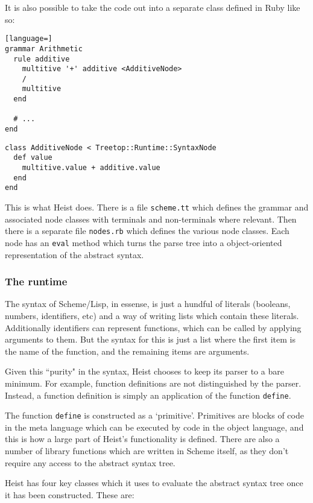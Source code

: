 It is also possible to take the code out into a separate class defined in Ruby like so:

\begin{lstlisting}[language=]
grammar Arithmetic
  rule additive
    multitive '+' additive <AdditiveNode>
    /
    multitive
  end
  
  # ...
end
\end{lstlisting}

\begin{lstlisting}
class AdditiveNode < Treetop::Runtime::SyntaxNode
  def value
    multitive.value + additive.value
  end
end
\end{lstlisting}

This is what Heist does. There is a file \texttt{scheme.tt} which defines the grammar and associated node classes with terminals and non-terminals where relevant. Then there is a separate file \texttt{nodes.rb} which defines the various node classes. Each node has an \texttt{eval} method which turns the parse tree into a object-oriented representation of the abstract syntax.

\subsubsection{The runtime}

The syntax of Scheme/Lisp, in essense, is just a hundful of literals (booleans, numbers, identifiers, etc) and a way of writing lists which contain these literals. Additionally identifiers can represent functions, which can be called by applying arguments to them. But the syntax for this is just a list where the first item is the name of the function, and the remaining items are arguments.

Given this ``purity" in the syntax, Heist chooses to keep its parser to a bare minimum. For example, function definitions are not distinguished by the parser. Instead, a function definition is simply an application of the function \texttt{define}.

The function \texttt{define} is constructed as a `primitive'. Primitives are blocks of code in the meta language which can be executed by code in the object language, and this is how a large part of Heist's functionality is defined. There are also a number of library functions which are written in Scheme itself, as they don't require any access to the abstract syntax tree.

Heist has four key classes which it uses to evaluate the abstract syntax tree once it has been constructed. These are:


